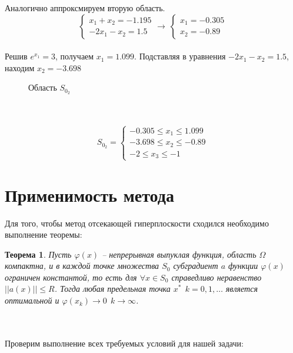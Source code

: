 \documentclass{article}
\newtheorem{theorem}{Теорема}
\begin{document}
\noindent Аналогично аппроксмируем вторую область. 
\begin{equation*}
    \begin{cases}
    x_1+x_2=-1.195\\
    -2x_1-x_2=1.5
    \end{cases}
    \rightarrow ~
    \begin{cases}
    x_1=-0.305\\
    x_2=-0.89
    \end{cases}
\end{equation*}
\\
Решив $e^{x_1}=3$, получаем $x_1=1.099$. Подставляя в уравнения $-2x_1-x_2=1.5$, находим $x_2=-3.698$
\begin{figure}[H]
\label{fig:image}
\caption{Область $S_{0_{2}}$}
\end{figure}
\\\\
\begin{equation*}
    S_{0_{2}}=
    \begin{cases}
    -0.305\le x_1 \le 1.099\\
    -3.698 \le x_2 \le -0.89\\
    -2 \le x_3 \le -1
    \end{cases}
\end{equation*}


\section{Применимость метода}
\noindent Для того, чтобы метод отсекающей гиперплоскости сходился необходимо выполнение теоремы:
\begin{theorem}
Пусть $\varphi(x)$ -- непрерывная выпуклая функция, область $\Omega$ компактна, и в каждой точке множества $S_0$ субградиент $a$ функции $\varphi(x)$ ограничен константой, то есть для $\forall x \in S_0$ справедливо неравенство $||a(x)||\le R$. Тогда любая предельная точка $x^{*}~~k=0,1,\dots$ является оптимальной и $\varphi(x_k) \rightarrow 0~~k \rightarrow \infty$.  
\end{theorem}
\\\\
\noindent Проверим выполнение всех требуемых условий для нашей задачи:
\begin{figure}[H]
\label{fig:image}
\end{figure}
\begin{figure}[H]
\label{fig:image}
\end{figure}
\end{document}
